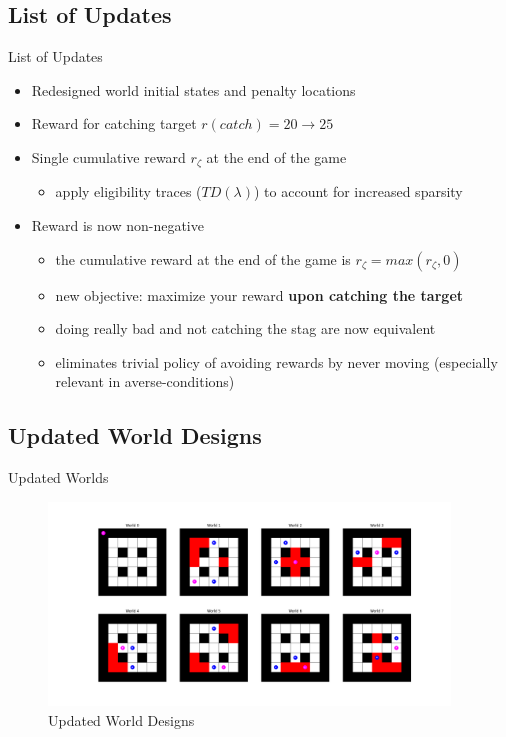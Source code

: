 \documentclass[aspectratio=1610, xcolor=dvipsnames]{packages/beamer}
\begin{document}
\subsection{List of Updates}
\begin{frame}{List of Updates}
    \begin{itemize}
        \item Redesigned world initial states and penalty locations
        \item Reward for catching target $r(catch)= 20 \rightarrow 25$
        \item Single cumulative reward $r_\zeta$ at the end of the game
        \begin{itemize}
            \item apply eligibility traces ($TD(\lambda)$) to account for increased sparsity
        \end{itemize}
        \item Reward is now non-negative
        \begin{itemize}
            \item the cumulative reward at the end of the game is $r_\zeta = max(r_\zeta,0)$
            \item new objective: maximize your reward \textbf{upon catching the target}
            \item doing really bad and not catching the stag are now equivalent
            \item eliminates trivial policy of avoiding rewards by never moving (especially relevant in averse-conditions)
        \end{itemize}
    \end{itemize}
\end{frame}

\subsection{Updated World Designs}
\begin{frame}{Updated Worlds}
    \begin{figure}
        \centering
        \includegraphics[width=0.95\textwidth]{../results/Fig_Worlds}
        \caption{Updated World Designs}
        \label{fig:Worlds0}
    \end{figure}

\end{frame}
\end{document}
